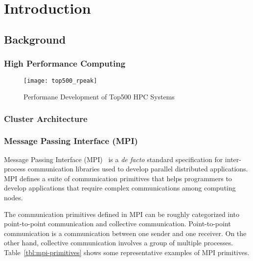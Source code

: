 \chapter{Introduction}

\section{Background}

\subsection{High Performance Computing}

\begin{figure}
    \centering
    \texttt{[image: top500\_rpeak]}
    \caption{Performane Development of Top500 HPC Systems}%
    \label{fig:top500-rpeak}
\end{figure}

\subsection{Cluster Architecture}

\subsection{Message Passing Interface (MPI)}

Message Passing Interface (MPI)~\autocite{MPIForum2012} is a \emph{de
facto} standard specification for inter-process communication libraries
used to develop parallel distributed applications. MPI defines a suite
of communication primitives that helps programmers to develop
applications that require complex communications among computing nodes.

The communication primitives defined in MPI can be roughly categorized
into point-to-point communication and collective communication.
Point-to-point communication is a communication between one sender and
one receiver. On the other hand, collective communication involves a
group of multiple processes. Table~\ref{tbl:mpi-primitives} shows some
representative examples of MPI primitives.

